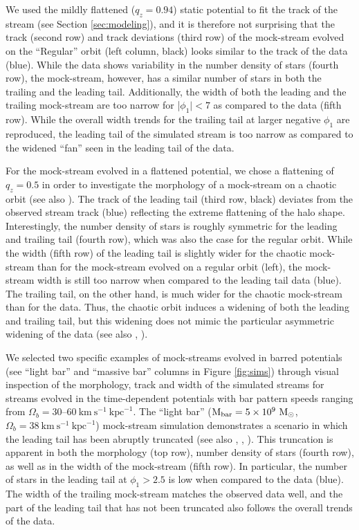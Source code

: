 \documentclass[twocolumn]{aastex62}
\newcommand{\msun}{\textrm{M}_\odot}
\newcommand{\kmskpc}{\ensuremath{\textrm{km}~\textrm{s}^{-1}~\textrm{kpc}^{-1}}}
\begin{document}
We used the mildly flattened ($q_z = 0.94$) static potential to fit the track of the stream (see Section \ref{sec:modeling}), and it is therefore not surprising that the track (second row) and track deviations (third row) of the mock-stream evolved on the ``Regular'' orbit (left column, black) looks similar to the track of the data (blue).
While the data shows variability in the number density of stars (fourth row), the mock-stream, however, has a similar number of stars in both the trailing and the leading tail.
Additionally, the width of both the leading and the trailing mock-stream are too narrow for |$\phi_1| < 7$ as compared to the data (fifth row).
While the overall width trends for the trailing tail  at larger negative $\phi_1$ are reproduced, the leading tail of the simulated stream is too narrow as compared to the widened ``fan'' seen in the leading tail of the data.

For the mock-stream evolved in a flattened potential, we chose a flattening of $q_z = 0.5$  in order to investigate the morphology of a mock-stream on a chaotic orbit (see also \citealt{Fardal:2015}).
The track of the leading tail (third row, black) deviates from the observed stream track (blue) reflecting the extreme flattening of the halo shape.
Interestingly, the number density of stars is roughly symmetric for the leading and trailing tail  (fourth row), which was also the case for the regular orbit.
While the width (fifth row) of the leading tail is slightly wider for the chaotic mock-stream than for the mock-stream evolved on a regular orbit (left), the mock-stream width is still too narrow when compared to the leading tail data (blue).
The trailing tail, on the other hand, is much wider for the chaotic mock-stream than for the data.
Thus, the chaotic orbit induces a widening of both the leading and trailing tail, but this widening does not mimic the particular asymmetric widening of the data (see also \citealt{Pearson:2015}, \citealt{Price-Whelan:2016}).

We selected two specific examples of mock-streams evolved in barred potentials (see ``light bar'' and ``massive bar'' columns in Figure \ref{fig:sims}) through visual inspection of the morphology, track and width of the simulated streams for streams evolved in the time-dependent potentials with bar pattern speeds ranging from $\Omega_b = 30$--$60~\kmskpc$.
The ``light bar''  ($\textrm{M}_{\rm bar} = 5\times 10^{9}~\msun$, $\Omega_b = 38 ~\kmskpc$) mock-stream simulation demonstrates a scenario in which the leading tail has been abruptly truncated (see also \citealt{Price-Whelan:2016b}, \citealt{Pearson:2017}, \citealt{Erkal:2017}).
This truncation is apparent in both the morphology (top row), number density of stars (fourth row), as well as in the width of the mock-stream (fifth row).
In particular, the number of stars in the leading tail at $\phi_1 > 2.5$ is low when compared to the data (blue).
The width of the trailing mock-stream matches the observed data well, and the part of the leading tail that has not been truncated also follows the overall trends of the data.
\end{document}
